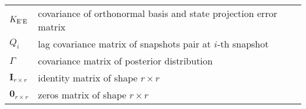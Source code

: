 \begin{table}[H]
\begin{tabular}{p{2cm}l}
		\(K _{\text{E'E}}\)                & covariance of orthonormal basis and state projection error matrix \\
		\(Q_i\)                        & lag covariance matrix of snapshots pair at \(i\)-th snapshot      \\
		\(\Gamma \)                    & covariance matrix of posterior distribution                       \\
		\(\textbf{I}_{r \times r}\)    & identity matrix of shape \(r \times r\)                           \\
		\(\mathbf{0}_{r \times r}\)    & zeros matrix of shape \(r \times r\)                              \\
	\end{tabular}
\end{table}

